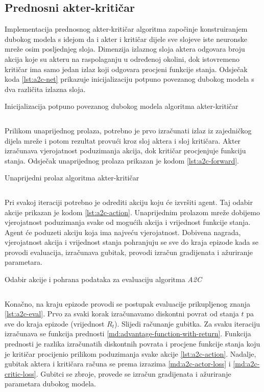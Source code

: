 \subsection{Prednosni akter-kritičar}

Implementacija prednosnog akter-kritičar algoritma započinje konstruiranjem dubokog modela s idejom da i akter i kritičar dijele sve slojeve iste neuronske mreže osim posljednjeg sloja. Dimenzija izlaznog sloja aktera odgovara broju akcija koje su akteru na raspolaganju u određenoj okolini, dok istovremeno kritičar ima samo jedan izlaz koji odgovara procjeni funkcije stanja. Odsječak koda \ref{lst:a2c-net} prikazuje inicijalizaciju potpuno povezanog dubokog modela s dva različita izlazna sloja.

\begin{listing}[H]
    \caption{Inicijalizacija potpuno povezanog dubokog modela algoritma akter-kritičar}
    \inputminted{python}{snippets/a2c-net.py}
    \label{lst:a2c-net}
\end{listing}

Prilikom unaprijednog prolaza, potrebno je prvo izračunati izlaz iz zajedničkog dijela mreže i potom rezultat provući kroz sloj aktera i sloj kritičara. Akter izračunava vjerojatnost poduzimanja akcija, dok kritičar procjenjuje funkciju stanja. Odsječak unaprijednog prolaza prikazan je kodom \ref{lst:a2c-forward}.

\begin{listing}[H]
    \caption{Unaprijedni prolaz algoritma akter-kritičar}
    \inputminted{python}{snippets/a2c-forward.py}
    \label{lst:a2c-forward}
\end{listing}

Pri svakoj iteraciji potrebno je odrediti akciju koju će izvršiti agent. Taj odabir akcije prikazan je kodom \ref{lst:a2c-action}. Unaprijednim prolazom mreže dobijemo vjerojatnost poduzimanja svake od mogućih akcija i vrijednost funkcije stanja. Agent će poduzeti akciju koja ima najveću vjerojatnost. Dobivena nagrada, vjerojatnost akcija i vrijednost stanja pohranjuju se sve do kraja epizode kada se provodi evaluacija, izračunava gubitak, provodi izračun gradijenata i ažuriranje parametara.

\begin{listing}[H]
    \caption{Odabir akcije i pohrana podataka za evaluaciju algoritma \textit{A2C}}
    \inputminted{python}{snippets/a2c-action.py}
    \label{lst:a2c-action}
\end{listing}

Konačno, na kraju epizode provodi se postupak evaluacije prikupljenog znanja \ref{lst:a2c-eval}. Prvo za svaki korak izračunavamo diskontni povrat od stanja $t$ pa sve do kraja epizode (vrijednost $R_t$). Slijedi računanje gubitka. Za svaku iteraciju izračunava se funkcija prednosti \ref{md:advantage-function-with-return}. Funkcija prednosti je razlika izračunatih diskontnih povrata i procjene funkcije stanja koju je kritičar procijenio prilikom poduzimanja svake akcije \ref{lst:a2c-action}. Nadalje, gubitak aktera i kritičara računa se prema izrazima \ref{md:a2c-actor-loss} i \ref{md:a2c-critic-loss}. Gubitci se zbroje, provede se izračun gradijenata i ažuriranje parametara dubokog modela.

